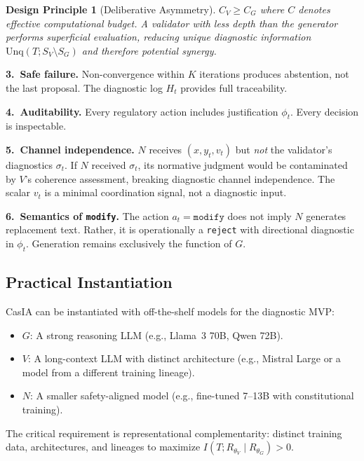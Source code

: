 \documentclass[11pt,a4paper]{article}
\newtheorem{principle}{Design Principle}[section]
\theoremstyle{definition}
\newcommand{\thetaG}{\theta_G}
\newcommand{\thetaV}{\theta_V}
\begin{document}
\begin{principle}[Deliberative Asymmetry]
\label{princ:asymmetry}
$C_V \geq C_G$ where $C$ denotes effective computational budget. A validator with less depth than the generator performs superficial evaluation, reducing unique diagnostic information $\mathrm{Unq}(T; S_V \setminus S_G)$ and therefore potential synergy.
\end{principle}

\textbf{3.~Safe failure.} Non-convergence within $K$ iterations produces abstention, not the last proposal. The diagnostic log $H_t$ provides full traceability.

\textbf{4.~Auditability.} Every regulatory action includes justification $\phi_t$. Every decision is inspectable.

\textbf{5.~Channel independence.} $N$ receives $(x, y_t, v_t)$ but \emph{not} the validator's diagnostics $\sigma_t$. If $N$ received $\sigma_t$, its normative judgment would be contaminated by $V$'s coherence assessment, breaking diagnostic channel independence. The scalar $v_t$ is a minimal coordination signal, not a diagnostic input.

\textbf{6.~Semantics of \texttt{modify}.} The action $a_t = \texttt{modify}$ does not imply $N$ generates replacement text. Rather, it is operationally a \texttt{reject} with directional diagnostic in $\phi_t$. Generation remains exclusively the function of $G$.

\subsection{Practical Instantiation}

CasIA can be instantiated with off-the-shelf models for the diagnostic MVP:
\begin{itemize}[leftmargin=*,itemsep=2pt]
\item $G$: A strong reasoning LLM (e.g., Llama~3 70B, Qwen 72B).
\item $V$: A long-context LLM with distinct architecture (e.g., Mistral Large or a model from a different training lineage).
\item $N$: A smaller safety-aligned model (e.g., fine-tuned 7--13B with constitutional training).
\end{itemize}
The critical requirement is representational complementarity: distinct training data, architectures, and lineages to maximize $I(T; R_{\thetaV} \mid R_{\thetaG}) > 0$.


\end{document}

